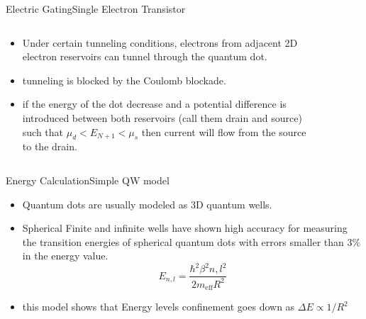 \documentclass{beamer}
\begin{document}
\begin{frame}{Electric Gating}{Single Electron Transistor}
    \begin{columns}
        \begin{column}{0.6\textwidth}
            \begin{itemize}
                \item Under certain tunneling conditions, electrons from adjacent 2D electron reservoirs can tunnel through the quantum dot.
                \item  tunneling is blocked by the Coulomb blockade.
                \item  if the energy of the dot decrease and a potential difference is introduced between both reservoirs (call them drain and source) such that $ \mu_d< E_{N+1} < \mu_s$ then current will flow from the source to the drain.
            \end{itemize}
        \end{column}

        \begin{column}{0.4\textwidth}
            \begin{figure}
                \centering
                \begin{subfigure}
                    \texttt{[image: SET2.png]}(a)
                \end{subfigure}

                \begin{subfigure}
                    \texttt{[image: Coloumb Blockade.png]}(b)
                \end{subfigure}
                \caption{}
                \label{Egating and SET}
            \end{figure}
        \end{column}
    \end{columns}
\end{frame}


\begin{frame}{Energy Calculation}{Simple QW model}
    \begin{itemize}
        \item Quantum dots are usually modeled as 3D quantum wells.
        \item Spherical Finite and infinite wells have shown high accuracy for measuring the transition energies of spherical quantum dots with errors smaller than $3\%$ in the energy value.
        \[ E_{n,l} = \frac{\hbar^2 \beta^2 n,l^2}{2 m_{\text{eff}} R^2} \]
        \item this model shows that Energy levels confinement goes down as $\Delta E \propto 1/R^2$
    \end{itemize}
\end{frame}
\end{document}

